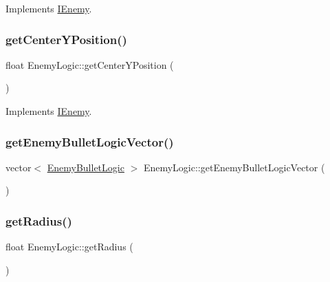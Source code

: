 Implements \hyperlink{class_i_enemy_ab5bc39484a8aeaf278c3d127ec5d9545}{I\+Enemy}.

\mbox{\label{class_enemy_logic_a8eb47a87a47288783e0c8963c39d24e4}} 
\subsubsection{\texorpdfstring{get\+Center\+Y\+Position()}{getCenterYPosition()}}
{\footnotesize\ttfamily float Enemy\+Logic\+::get\+Center\+Y\+Position (\begin{DoxyParamCaption}{ }\end{DoxyParamCaption})\hspace{0.3cm}{\ttfamily [virtual]}}



Implements \hyperlink{class_i_enemy_ac9a2d69103fa86d8344aa368fb33c714}{I\+Enemy}.

\mbox{\label{class_enemy_logic_ae4e49b9f854bc0407510de8e3824c7c4}} 
\subsubsection{\texorpdfstring{get\+Enemy\+Bullet\+Logic\+Vector()}{getEnemyBulletLogicVector()}}
{\footnotesize\ttfamily vector$<$ \hyperlink{class_enemy_bullet_logic}{Enemy\+Bullet\+Logic} $>$ Enemy\+Logic\+::get\+Enemy\+Bullet\+Logic\+Vector (\begin{DoxyParamCaption}{ }\end{DoxyParamCaption})}

\mbox{\label{class_enemy_logic_ab6736c870e69bc20bef8d6d010946eb2}} 
\subsubsection{\texorpdfstring{get\+Radius()}{getRadius()}}
{\footnotesize\ttfamily float Enemy\+Logic\+::get\+Radius (\begin{DoxyParamCaption}{ }\end{DoxyParamCaption})\hspace{0.3cm}{\ttfamily [virtual]}}



